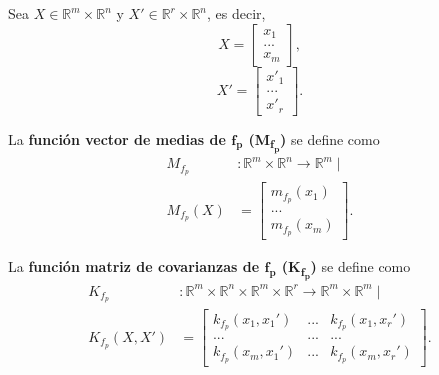\begin{defin*}
Sea $X \in \mathbb{R}^m \times \mathbb{R}^n$ y $X' \in \mathbb{R}^r \times \mathbb{R}^n$, es decir,
\begin{equation*}
    X =     
    \left[
        \begin{array}{c}
        x_1  \\
        ... \\
        x_m
        \end{array}
    \right],
\end{equation*}
\begin{equation*}
    X' =     
    \left[
        \begin{array}{c}
        x'_1  \\
        ... \\
        x'_r
        \end{array}
    \right].
\end{equation*}

La \textbf{función vector de medias de $\bm{f_p}$ (M\textsubscript{$\bm{f_p}$})} se define como
\begin{equation*}
\begin{aligned}
    M_{f_p}&: \mathbb{R}^m \times \mathbb{R}^n \rightarrow \mathbb{R}^m
    \mid\\
    M_{f_p}(X) &=     
    \left[
        \begin{array}{c}
        m_{f_p}(x_1)  \\
        ... \\
        m_{f_p}(x_m)
        \end{array}
    \right].
\end{aligned}
\end{equation*}

La \textbf{función matriz de covarianzas de $\bm{f_p}$ (K\textsubscript{$\bm{f_p}$})} se define como
\begin{equation*}
\begin{aligned}
    K_{f_p}&: \mathbb{R}^m \times \mathbb{R}^n \times \mathbb{R}^m \times \mathbb{R}^r \rightarrow \mathbb{R}^m \times \mathbb{R}^m
    \mid\\
    K_{f_p}(X,X') &=     
    \left[
        \begin{array}{ccc}
        k_{f_p}(x_1,x_1') & ... & k_{f_p}(x_1,x_r')  \\
        ... & ... & ... \\
        k_{f_p}(x_m,x_1') & ... & k_{f_p}(x_m,x_r')
        \end{array}
    \right].
\end{aligned}
\end{equation*}
\end{defin*}

